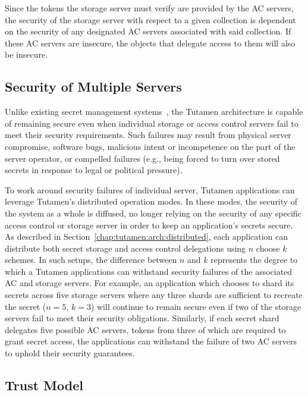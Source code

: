 Since the tokens the storage server must verify are provided by the AC
servers, the security of the storage server with respect to a given
collection is dependent on the security of any designated AC servers
associated with said collection. If these AC servers are insecure, the
objects that delegate access to them will also be insecure.

\subsection{Security of Multiple Servers}

Unlike existing secret management systems~\cite{vault, confidant,
  keywhiz}, the Tutamen architecture is capable of remaining secure
even when individual storage or access control servers fail to meet
their security requirements. Such failures may result from physical
server compromise, software bugs, malicious intent or incompetence on
the part of the server operator, or compelled failures (e.g., being
forced to turn over stored secrets in response to legal or political
pressure).

To work around security failures of individual server, Tutamen
applications can leverage Tutamen's distributed operation modes. In
these modes, the security of the system as a whole is diffused, no
longer relying on the security of any specific access control or
storage server in order to keep an application's secrets secure. As
described in Section~\ref{chap:tutamen:arch:distributed}, each
application can distribute both secret storage and access control
delegations using $n$ choose $k$ schemes. In such setups, the
difference between $n$ and $k$ represents the degree to which a
Tutamen applications can withstand security failures of the associated
AC and storage servers. For example, an application which chooses to
shard its secrets across five storage servers where any three shards
are sufficient to recreate the secret ($n=5$, $k=3$) will continue to
remain secure even if two of the storage servers fail to meet their
security obligations. Similarly, if each secret shard delegates five
possible AC servers, tokens from three of which are required to grant
secret access, the applications can withstand the failure of two AC
servers to uphold their security guarantees.

\subsection{Trust Model}

